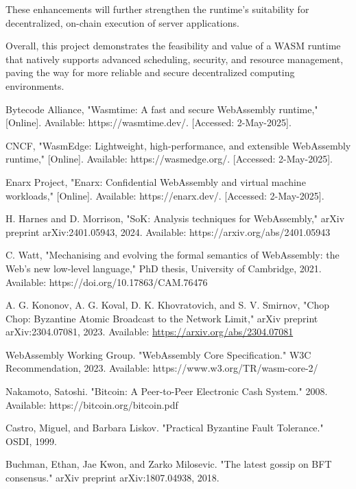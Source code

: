 \documentclass[10pt,a4paper,twocolumn]{IEEEtran}
\begin{document}
These enhancements will further strengthen the runtime's suitability for decentralized, on-chain execution of server applications.

Overall, this project demonstrates the feasibility and value of a WASM runtime that natively supports advanced scheduling, security, and resource management, paving the way for more reliable and secure decentralized computing environments.

\begin{thebibliography}{99}

 Bytecode Alliance, "Wasmtime: A fast and secure WebAssembly runtime," [Online]. Available: https://wasmtime.dev/. [Accessed: 2-May-2025].

 CNCF, "WasmEdge: Lightweight, high-performance, and extensible WebAssembly runtime," [Online]. Available: https://wasmedge.org/. [Accessed: 2-May-2025].

 Enarx Project, "Enarx: Confidential WebAssembly and virtual machine workloads," [Online]. Available: https://enarx.dev/. [Accessed: 2-May-2025].

 H. Harnes and D. Morrison, "SoK: Analysis techniques for WebAssembly," arXiv preprint arXiv:2401.05943, 2024. Available: https://arxiv.org/abs/2401.05943

 C. Watt, "Mechanising and evolving the formal semantics of WebAssembly: the Web's new low-level language," PhD thesis, University of Cambridge, 2021. Available: https://doi.org/10.17863/CAM.76476

 A. G. Kononov, A. G. Koval, D. K. Khovratovich, and S. V. Smirnov, "Chop Chop: Byzantine Atomic Broadcast to the Network Limit," arXiv preprint arXiv:2304.07081, 2023. Available: \url{https://arxiv.org/abs/2304.07081}

 WebAssembly Working Group. "WebAssembly Core Specification." W3C Recommendation, 2023. Available: https://www.w3.org/TR/wasm-core-2/

 Nakamoto, Satoshi. "Bitcoin: A Peer-to-Peer Electronic Cash System." 2008. Available: https://bitcoin.org/bitcoin.pdf

 Castro, Miguel, and Barbara Liskov. "Practical Byzantine Fault Tolerance." OSDI, 1999.

 Buchman, Ethan, Jae Kwon, and Zarko Milosevic. "The latest gossip on BFT consensus." arXiv preprint arXiv:1807.04938, 2018.


\end{thebibliography}
\end{document}
